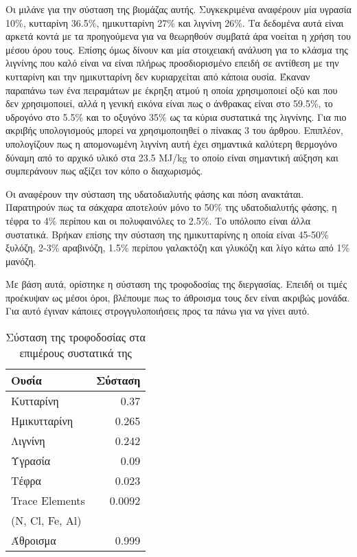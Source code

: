 \documentclass[11pt]{article}
\begin{document}
Οι \cite{fernandez-bolanosCharacterizationLigninObtained1999} μιλάνε για την σύσταση της βιομάζας αυτής. Συγκεκριμένα αναφέρουν μία υγρασία 10\%, κυτταρίνη 36.5\%, ημικυτταρίνη 27\% και λιγνίνη 26\%. Τα δεδομένα αυτά είναι αρκετά κοντά με τα προηγούμενα για να θεωρηθούν συμβατά άρα νοείται η χρήση του μέσου όρου τους. Επίσης όμως δίνουν και μία στοιχειακή ανάλυση για το κλάσμα της λιγνίνης που καλό είναι να είναι πλήρως προσδιορισμένο επειδή σε αντίθεση με την κυτταρίνη και την ημικυτταρίνη δεν κυριαρχείται από κάποια ουσία. Έκαναν παραπάνω των ένα πειραμάτων με έκρηξη ατμού η οποία χρησιμοποιεί οξύ και που δεν χρησιμοποιεί, αλλά η γενική εικόνα είναι πως ο άνθρακας είναι στο 59.5\%, το υδρογόνο στο 5.5\% και το οξυγόνο 35\% ως τα κύρια συστατικά της λιγνίνης. Για πιο ακριβής υπολογισμούς μπορεί να χρησιμοποιηθεί ο πίνακας 3 του άρθρου. Επιπλέον, υπολογίζουν πως η απομονωμένη λιγνίνη αυτή έχει σημαντικά καλύτερη θερμογόνο δύναμη από το αρχικό υλικό στα 23.5 MJ/kg το οποίο είναι σημαντική αύξηση και συμπεράνουν πως αξίζει τον κόπο ο διαχωρισμός.

Οι \cite{fernandez-bolanosSteamexplosionOliveStones2001} αναφέρουν την σύσταση της υδατοδιαλυτής φάσης και πόση ανακτάται. Παρατηρούν πως τα σάκχαρα αποτελούν μόνο το 50\% της υδατοδιαλυτής φάσης, η τέφρα το 4\% περίπου και οι πολυφαινόλες το 2.5\%. Το υπόλοιπο είναι άλλα συστατικά. Βρήκαν επίσης την σύσταση της ημικυτταρίνης η οποία είναι 45-50\% ξυλόζη, 2-3\% αραβινόζη, 1.5\% περίπου γαλακτόζη και γλυκόζη και λίγο κάτω από 1\% μανόζη. 

Με βάση αυτά, ορίστηκε η σύσταση της τροφοδοσίας της διεργασίας. Επειδή οι τιμές προέκυψαν ως μέσοι όροι, βλέπουμε πως το άθροισμα τους δεν είναι ακριβώς μονάδα. Για αυτό έγιναν κάποιες στρογγυλοποιήσεις προς τα πάνω για να γίνει αυτό.

\begin{table}[htbp]
\caption{Σύσταση της τροφοδοσίας στα επιμέρους συστατικά της}
\centering
\begin{tabular}{lr}
Ουσία & Σύσταση\\
\hline
Κυτταρίνη & 0.37\\
Ημικυτταρίνη & 0.265\\
Λιγνίνη & 0.242\\
Υγρασία & 0.09\\
Τέφρα & 0.023\\
Trace Elements & 0.0092\\
(N, Cl, Fe, Al) & \\
\hline
Άθροισμα & 0.999\\
\end{tabular}
\end{table}
\end{document}
